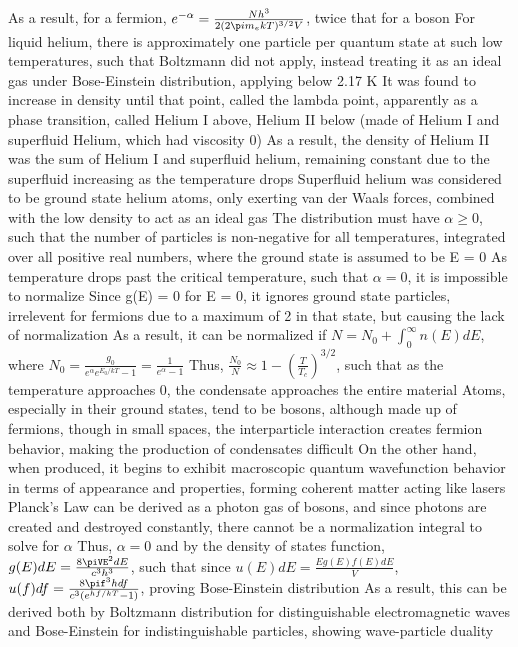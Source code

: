 \documentclass[11 pt, twoside]{article}
\newenvironment{outline*}
{
	\begin{outline}[enumerate]
	}
	{\end{outline}
}
\begin{document}
\begin{outline*}
			\4 As a result, for a fermion, $e^{-\alpha} = \frac{Nh^3}{2(2\p im_ekT)^{3/2}V}$, twice that for a boson
	\2 For liquid helium, there is approximately one particle per quantum state at such low temperatures, such that Boltzmann did not apply, instead treating it as an ideal gas under Bose-Einstein distribution, applying below 2.17 K
		\3 It was found to increase in density until that point, called the lambda point, apparently as a phase transition, called Helium I above, Helium II below (made of Helium I and superfluid Helium, which had viscosity 0)
			\4 As a result, the density of Helium II was the sum of Helium I and superfluid helium, remaining constant due to the superfluid increasing as the temperature drops
			\4 Superfluid helium was considered to be ground state helium atoms, only exerting van der Waals forces, combined with the low density to act as an ideal gas
		\3 The distribution must have $\alpha \geq 0$, such that the number of particles is non-negative for all temperatures, integrated over all positive real numbers, where the ground state is assumed to be E = 0
			\4 As temperature drops past the critical temperature, such that $\alpha = 0$, it is impossible to normalize
			\4 Since g(E) = 0 for E = 0, it ignores ground state particles, irrelevent for fermions due to a maximum of 2 in that state, but causing the lack of normalization
			\4 As a result, it can be normalized if $N = N_0 + \int_0^{\infty} n(E)dE$, where $N_0 = \frac{g_0}{e^{\alpha}e^{E_0/kT} - 1} = \frac{1}{e^{\alpha} - 1}$
			\4 Thus, $\frac{N_0}{N} \approx 1 - (\frac{T}{T_c})^{3/2}$, such that as the temperature approaches 0, the condensate approaches the entire material
		\3 Atoms, especially in their ground states, tend to be bosons, although made up of fermions, though in small spaces, the interparticle interaction creates fermion behavior, making the production of condensates difficult
			\4 On the other hand, when produced, it begins to exhibit macroscopic quantum wavefunction behavior in terms of appearance and properties, forming coherent matter acting like lasers
\1 Planck's Law can be derived as a photon gas of bosons, and since photons are created and destroyed constantly, there cannot be a normalization integral to solve for $\alpha$
	\2 Thus, $\alpha = 0$ and by the density of states function, $g(E)dE = \frac{8\piVE^2dE}{c^3h^3}$, such that since $u(E)dE = \frac{Eg(E)f(E)dE}{V}$, $u(f)df = \frac{8\pif^3hdf}{c^3(e^{hf/kT} - 1)}$, proving Bose-Einstein distribution
		\3 As a result, this can be derived both by Boltzmann distribution for distinguishable electromagnetic waves and Bose-Einstein for indistinguishable particles, showing wave-particle duality

\end{outline*}
\end{document}
